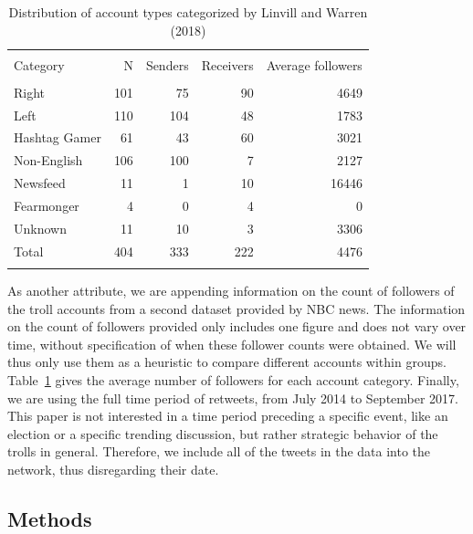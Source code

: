 \documentclass[12pt, titlepage=true, toc=bib]{scrartcl}
\begin{document}
\begin{table}[!ht] \centering 
\begin{tabular*}{.95\linewidth}{@{\extracolsep{\fill}} lrrrr} 
\\[-1.8ex]\hline 
\hline \\[-1.8ex] 
Category & N & Senders & Receivers & Average followers \\ 
\hline \\[-1.8ex] 
Right & 101 & 75 & 90 & 4649 \\ 
Left & 110 & 104 & 48 & 1783 \\ 
Hashtag Gamer & 61 & 43 & 60 & 3021 \\ 
Non-English & 106 & 100 & 7 & 2127 \\ 
Newsfeed & 11 & 1 & 10 & 16446 \\ 
Fearmonger & 4 & 0 & 4 & 0 \\ 
Unknown & 11 & 10 & 3 & 3306 \\ 
Total & 404 & 333 & 222 & 4476 \\ 
\hline \\[-1.8ex] 
\end{tabular*} 
  \caption[Troll Statistics]{Distribution of account types categorized by Linvill and Warren (2018)}
  \label{tab:trollstat} 
\end{table} 
 
As another attribute, we are appending information on the count of followers of the troll accounts from a second dataset provided by NBC news. The information on the count of followers provided only includes one figure and does not vary over time, without specification of when these follower counts were obtained. We will thus only use them as a heuristic to compare different accounts within groups. Table~\ref{tab:trollstat} gives the average number of followers for each account category. Finally, we are using the full time period of retweets, from July 2014 to September 2017. This paper is not interested in a time period preceding a specific event, like an election or a specific trending discussion, but rather strategic behavior of the trolls in general. Therefore, we include all of the tweets in the data into the network, thus disregarding their date.


\subsection{Methods}
\end{document}
